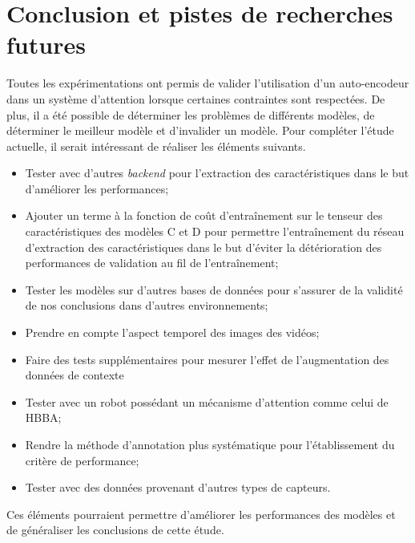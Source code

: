 \section{Conclusion et pistes de recherches futures}
    Toutes les expérimentations ont permis de valider l'utilisation d'un auto-encodeur dans un système d'attention lorsque certaines contraintes sont respectées. De plus, il a été possible de déterminer les problèmes de différents modèles, de déterminer le meilleur modèle et d'invalider un modèle. Pour compléter l'étude actuelle, il serait intéressant de réaliser les éléments suivants.

    \begin{itemize}
        \item Tester avec d'autres \textit{backend} pour l'extraction des caractéristiques dans le but d'améliorer les performances;
        \item Ajouter un terme à la fonction de coût d'entraînement sur le tenseur des caractéristiques des modèles C et D  pour permettre l'entraînement du réseau d'extraction des caractéristiques dans le but d'éviter la détérioration des performances de validation au fil de l'entraînement;
        \item Tester les modèles sur d'autres bases de données pour s'assurer de la validité de nos conclusions dans d'autres environnements;
        \item Prendre en compte l'aspect temporel des images des vidéos;
        \item Faire des tests supplémentaires pour mesurer l'effet de l'augmentation des données de contexte
        \item Tester avec un robot possédant un mécanisme d'attention comme celui de HBBA;
        \item Rendre la méthode d'annotation plus systématique pour l'établissement du critère de performance;
        \item Tester avec des données provenant d'autres types de capteurs.
    \end{itemize}
    
    Ces éléments pourraient permettre d'améliorer les performances des modèles et de généraliser les conclusions de cette étude.
